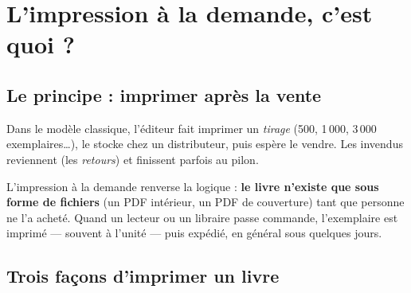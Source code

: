 \section{L’impression à la demande, c’est quoi ?}

\subsection{Le principe : imprimer après la vente}

Dans le modèle classique, l’éditeur fait imprimer un \emph{tirage}
(500, 1\,000, 3\,000 exemplaires…), le stocke chez un distributeur,
puis espère le vendre. Les invendus reviennent (les \emph{retours}) et
finissent parfois au pilon.

L’impression à la demande renverse la logique : \textbf{le livre
n’existe que sous forme de fichiers} (un PDF intérieur, un PDF de
couverture) tant que personne ne l’a acheté. Quand un lecteur ou un
libraire passe commande, l’exemplaire est imprimé — souvent à l’unité —
puis expédié, en général sous quelques jours.

\begin{center}
\end{center}

\subsection{Trois façons d’imprimer un livre}

